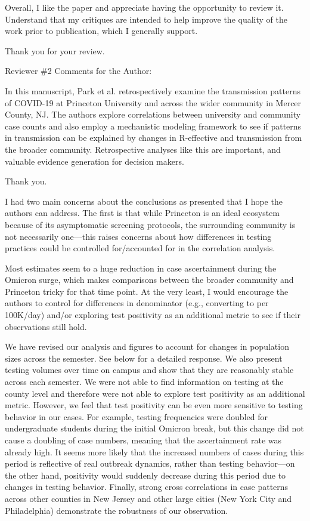 \documentclass[12pt]{article}
\newcommand{\revtext}{\textsf}
\begin{document}
\revtext{Overall, I like the paper and appreciate having the opportunity to review it. Understand that my critiques are intended to help improve the quality of the work prior to publication, which I generally support.}

Thank you for your review.

\revtext{Reviewer \#2 Comments for the Author:} 

\revtext{In this manuscript, Park et al. retrospectively examine the transmission patterns of COVID-19 at Princeton University and across the wider community in Mercer County, NJ. The authors explore correlations between university and community case counts and also employ a mechanistic modeling framework to see if patterns in transmission can be explained by changes in R-effective and transmission from the broader community. Retrospective analyses like this are important, and valuable evidence generation for decision makers.}

Thank you.

\revtext{I had two main concerns about the conclusions as presented that I hope the authors can address. The first is that while Princeton is an ideal ecosystem because of its asymptomatic screening protocols, the surrounding community is not necessarily one—this raises concerns about how differences in testing practices could be controlled for/accounted for in the correlation analysis.} 

\revtext{Most estimates seem to a huge reduction in case ascertainment during the Omicron surge, which makes comparisons between the broader community and Princeton tricky for that time point. At the very least, I would encourage the authors to control for differences in denominator (e.g., converting to per 100K/day) and/or exploring test positivity as an additional metric to see if their observations still hold.}

We have revised our analysis and figures to account for changes in population sizes across the semester. See below for a detailed response.
We also present testing volumes over time on campus and show that they are reasonably stable across each semester.
We were not able to find information on testing at the county level and therefore were not able to explore test positivity as an additional metric.
However, we feel that test positivity can be even more sensitive to testing behavior in our cases.
For example, testing frequencies were doubled for undergraduate students during the initial Omicron break, but this change did not cause a doubling of case numbers, meaning that the ascertainment rate was already high. 
It seems more likely that the increased numbers of cases during this period is reflective of real outbreak dynamics, rather than testing behavior---on the other hand, positivity would suddenly decrease during this period due to changes in testing behavior.
Finally, strong cross correlations in case patterns across other counties in New Jersey and other large cities (New York City and Philadelphia) demonstrate the robustness of our observation.
\end{document}
